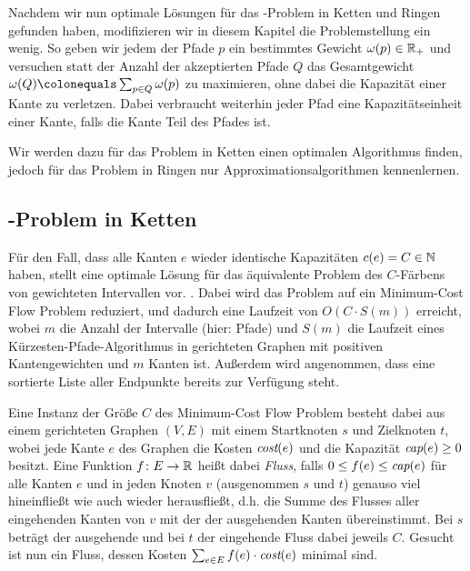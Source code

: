 Nachdem wir nun optimale Lösungen für das \CallControl-Problem in Ketten und Ringen gefunden haben, modifizieren
wir in diesem Kapitel die Problemstellung ein wenig.
So geben wir jedem der Pfade $p$ ein bestimmtes Gewicht $\omega(p) \in \mathbb R_+$ und versuchen statt der
Anzahl der akzeptierten Pfade $Q$ das Gesamtgewicht $\omega(Q) \colonequals \sum_{p\in Q}\omega(p)$ zu maximieren, ohne
dabei die Kapazität einer Kante zu verletzen.
Dabei verbraucht weiterhin jeder Pfad eine Kapazitätseinheit einer Kante, falls die Kante Teil des Pfades ist.

Wir werden dazu für das Problem in Ketten einen optimalen Algorithmus finden, jedoch für das Problem in Ringen
nur Approximationsalgorithmen kennenlernen. 

\subsection{\WeightedCallControl-Problem in Ketten}\label{subsec:weighted-call-control-in-chains}
Für den Fall, dass alle Kanten $e$ wieder identische Kapazitäten $c(e) = C \in \mathbb N$ haben, stellt 
eine optimale Lösung für das äquivalente Problem des $C$-Färbens von gewichteten Intervallen vor. .
Dabei wird das Problem auf ein Minimum-Cost Flow Problem reduziert, und dadurch eine Laufzeit von $O(C\cdot S(m))$
erreicht, wobei $m$ die Anzahl der Intervalle (hier: Pfade) und $S(m)$ die Laufzeit eines Kürzesten-Pfade-Algorithmus
in gerichteten Graphen mit positiven Kantengewichten und $m$ Kanten ist.
Außerdem wird angenommen, dass eine sortierte Liste aller Endpunkte bereits zur Verfügung steht. 

Eine Instanz der Größe $C$ des Minimum-Cost Flow Problem besteht dabei aus einem gerichteten Graphen $(V,E)$ mit
einem Startknoten $s$ und Zielknoten $t$, wobei jede Kante $e$ des Graphen die Kosten $\text{\em cost}(e)$ und die Kapazität
$\text{\em cap}(e) \geq 0$ besitzt.
Eine Funktion $f\colon E \rightarrow \mathbb R$ heißt dabei {\em Fluss}, falls  $0 \leq f(e) \leq \text{\em cap}(e)$ für alle
Kanten $e$ und in jeden Knoten $v$ (ausgenommen $s$ und $t$) genauso viel hineinfließt wie auch wieder herausfließt, d.h.
die Summe des Flusses aller eingehenden Kanten von $v$ mit der der ausgehenden Kanten übereinstimmt.
Bei $s$ beträgt der ausgehende und bei $t$ der eingehende Fluss dabei jeweils $C$.
Gesucht ist nun ein Fluss, dessen Kosten $\sum_{e\in E}f(e) \cdot \text{\em cost}(e)$ minimal sind.

